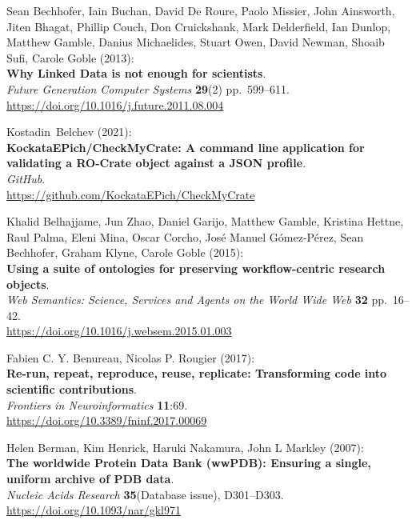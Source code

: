 \begin{thebibliography}{9}
Sean Bechhofer, Iain Buchan, David De Roure, Paolo Missier,
John Ainsworth, Jiten Bhagat, Phillip Couch, Don Cruickshank, Mark
Delderfield, Ian Dunlop, Matthew Gamble, Danius Michaelides, Stuart
Owen, David Newman, Shoaib Sufi, Carole Goble (2013):\\
\textbf{Why Linked Data is not enough for scientists}.\\
\emph{Future Generation Computer Systems} \textbf{29}(2)
pp.~599--611.\\
\url{https://doi.org/10.1016/j.future.2011.08.004}

Kostadin~Belchev (2021):\\
\textbf{KockataEPich/CheckMyCrate: A command line application for
validating a RO-Crate object against a JSON profile}.\\
\emph{GitHub}.\\
\url{https://github.com/KockataEPich/CheckMyCrate}

Khalid Belhajjame, Jun Zhao, Daniel Garijo, Matthew Gamble,
Kristina Hettne, Raul Palma, Eleni Mina, Oscar Corcho, José Manuel
Gómez-Pérez, Sean Bechhofer, Graham Klyne, Carole Goble (2015):\\
\textbf{Using a suite of ontologies for preserving workflow-centric
research objects}.\\
\emph{Web Semantics: Science, Services and Agents on the World Wide Web}
\textbf{32} pp.~16--42.\\
\url{https://doi.org/10.1016/j.websem.2015.01.003}

Fabien C. Y. Benureau, Nicolas P. Rougier (2017):\\
\textbf{Re-run, repeat, reproduce, reuse, replicate: Transforming code
into scientific contributions}.\\
\emph{Frontiers in Neuroinformatics} \textbf{11}:69.\\
\url{https://doi.org/10.3389/fninf.2017.00069}

Helen Berman, Kim Henrick, Haruki Nakamura, John L Markley
(2007):\\
\textbf{The worldwide Protein Data Bank (wwPDB): Ensuring a single,
uniform archive of PDB data}.\\
\emph{Nucleic Acids Research} \textbf{35}(Database issue),
D301--D303.\\
\url{https://doi.org/10.1093/nar/gkl971}


\end{thebibliography}
